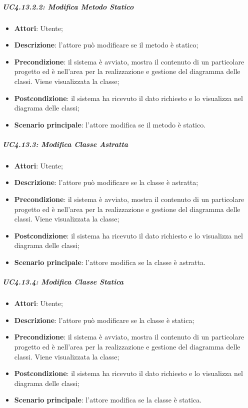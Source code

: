 \subparagraph{UC4.13.2.2: Modifica Metodo Statico}
\label{UC4.13.2.2}
\begin{itemize}
	\item \textbf{Attori}: Utente;
	\item \textbf{Descrizione}: l'attore può modificare se il metodo è statico;
	\item \textbf{Precondizione}: il sistema è avviato, mostra il contenuto di un particolare progetto ed è nell'area per la realizzazione e gestione del diagramma delle classi. Viene visualizzata la classe;
	\item \textbf{Postcondizione}: il sistema ha ricevuto il dato richiesto e lo visualizza nel diagrama delle classi;
	\item \textbf{Scenario principale}: l'attore modifica se il metodo è statico.
\end{itemize}

\subparagraph{UC4.13.3: Modifica Classe Astratta}
\label{UC4.13.3}
\begin{itemize}
	\item \textbf{Attori}: Utente;
	\item \textbf{Descrizione}: l'attore può modificare se la classe è astratta;
	\item \textbf{Precondizione}: il sistema è avviato, mostra il contenuto di un particolare progetto ed è nell'area per la realizzazione e gestione del diagramma delle classi. Viene visualizzata la classe;
	\item \textbf{Postcondizione}: il sistema ha ricevuto il dato richiesto e lo visualizza nel diagrama delle classi;
	\item \textbf{Scenario principale}: l'attore modifica se la classe è astratta.
\end{itemize}

\subparagraph{UC4.13.4: Modifica Classe Statica}
\label{UC4.13.4}
\begin{itemize}
	\item \textbf{Attori}: Utente;
	\item \textbf{Descrizione}: l'attore può modificare se  la classe è statica;
	\item \textbf{Precondizione}: il sistema è avviato, mostra il contenuto di un particolare progetto ed è nell'area per la realizzazione e gestione del diagramma delle classi. Viene visualizzata la classe;
	\item \textbf{Postcondizione}: il sistema ha ricevuto il dato richiesto e lo visualizza nel diagrama delle classi;
	\item \textbf{Scenario principale}: l'attore modifica se la classe è statica.
\end{itemize}

